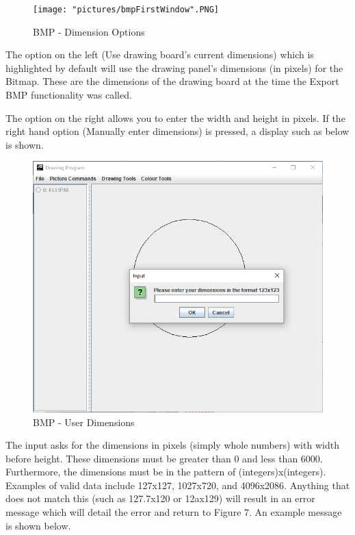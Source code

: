 \documentclass[12pt]{article} %
\begin{document}
\begin{figure}[hbtp]
\caption{BMP - Dimension Options}
\centering
\texttt{[image: "pictures/bmpFirstWindow".PNG]}
\end{figure}

The option on the left (Use drawing board's current dimensions) which is highlighted by default will use the drawing panel's dimensions (in pixels) for the Bitmap. These are the dimensions of the drawing board at the time the Export BMP functionality was called.

The option on the right allows you to enter the width and height in pixels. If the right hand option (Manually enter dimensions) is pressed, a display such as below is shown.


\begin{figure}[H]
\caption{BMP - User Dimensions}
\centering
\includegraphics[scale=0.75]{pictures/bmpSecondWindow.PNG}
\end{figure}


The input asks for the dimensions in pixels (simply whole numbers) with width before height. These dimensions must be greater than 0 and less than 6000. Furthermore, the dimensions must be in the pattern of (integers)x(integers). Examples of valid data include 127x127, 1027x720, and 4096x2086. Anything that does not match this (such as 127.7x120 or 12ax129) will result in an error message which will detail the error and return to Figure 7. An example message is shown below.
\end{document}
